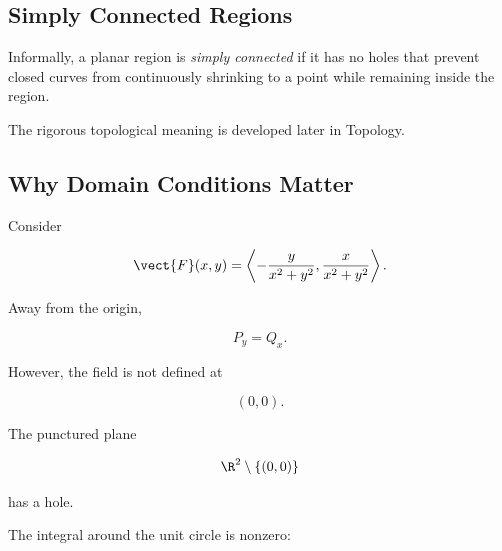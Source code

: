 \subsection{Simply Connected Regions}
\label{subsec:simply-connected-vector-calculus}

Informally, a planar region is \emph{simply connected} if it has no holes
that prevent closed curves from continuously shrinking to a point while
remaining inside the region.

\begin{center}
\end{center}

The rigorous topological meaning is developed later in Topology.

\subsection{Why Domain Conditions Matter}
\label{subsec:domain-conditions-conservative}

Consider

\[ \vect{F}(x,y)
=
\left\langle
-\frac{y}{x^2+y^2},
\frac{x}{x^2+y^2}
\right\rangle. \]

Away from the origin,

\[ P_y=Q_x. \]

However, the field is not defined at

\[ (0,0). \]

The punctured plane

\[ \R^2\setminus\{(0,0)\} \]

has a hole.

The integral around the unit circle is nonzero:

